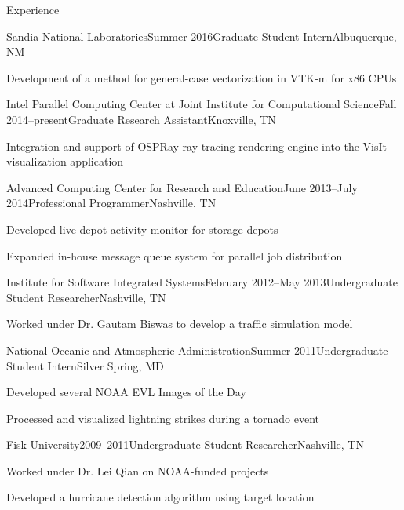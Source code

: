 \documentclass{resume} %
\begin{document}
\begin{rSection}{Experience}

\begin{rSubsection}{Sandia National Laboratories}{Summer 2016}{Graduate Student Intern}{Albuquerque, NM}
    \item Development of a method for general-case vectorization in VTK-m for x86 CPUs
\end{rSubsection}


\begin{rSubsection}{Intel Parallel Computing Center at Joint Institute for Computational Science}{Fall 2014--present}{Graduate Research Assistant}{Knoxville, TN}
    \item Integration and support of OSPRay ray tracing rendering engine into the VisIt \\ visualization application
\end{rSubsection}


\begin{rSubsection}{Advanced Computing Center for Research and Education}{June 2013--July 2014}{Professional Programmer}{Nashville, TN}
\item Developed live depot activity monitor for storage depots
\item Expanded in-house message queue system for parallel job distribution
\end{rSubsection}


\begin{rSubsection}{Institute for Software Integrated Systems}{February 2012--May 2013}{Undergraduate Student Researcher}{Nashville, TN}
\item Worked under Dr. Gautam Biswas to develop a traffic simulation model
\end{rSubsection}


\begin{rSubsection}{National Oceanic and Atmospheric Administration}{Summer 2011}{Undergraduate Student Intern}{Silver Spring, MD}
\item Developed several NOAA EVL Images of the Day
\item Processed and visualized lightning strikes during a tornado event
\end{rSubsection}


\begin{rSubsection}{Fisk University}{2009--2011}{Undergraduate Student Researcher}{Nashville, TN}
    \item Worked under Dr. Lei Qian on NOAA-funded projects
    \item Developed a hurricane detection algorithm using target location
\end{rSubsection}

\end{rSection}
\end{document}
